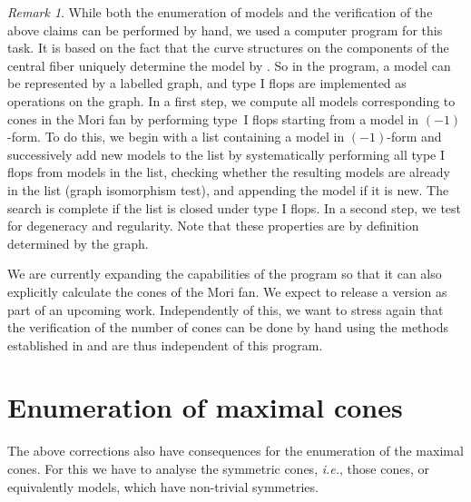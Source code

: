 \documentclass[11pt]{amsart}
\numberwithin{equation}{section}
\theoremstyle{plain}
\theoremstyle{remark}
\newtheorem{remark}[theorem]{Remark}
\begin{document}
\begin{remark}\label{remark computer program}
While both the enumeration of models and the verification of the above claims can be performed by hand, we used a computer program for this task. It is based on the fact that the curve structures on the components of the central fiber uniquely determine the model by \cite[Sections 4.2 and 7.1]{HL22}. So in the program, a model can be represented by a labelled graph, and type I flops are implemented as operations on the graph. In a first step, we compute all models corresponding to cones in the Mori fan by performing type~I flops starting from a model in $(-1)$-form. To do this, we begin with a list containing a model in $(-1)$-form and successively add new models to the list by systematically performing all type I flops from models in the list, checking whether the resulting models are already in the list (graph isomorphism test), and appending the model if it is new. The search is complete if the list is closed under type I flops. In a second step, we test for degeneracy and regularity. Note that these properties are by definition determined by the graph.

We are currently expanding the capabilities of the program so that it can also explicitly calculate the cones of the Mori fan. We expect to release a version as part of an upcoming work. Independently of this, we want to stress again that the verification of the number of cones can be done by hand using the methods established in \cite{HL22} and are thus independent of this program.
\end{remark}

\section{Enumeration of maximal cones}

The above corrections also have consequences for the enumeration of the maximal cones. For this we have to analyse the symmetric cones, \textit{i.e.}, those cones, or equivalently 
models, which have non-trivial symmetries.
\end{document}
